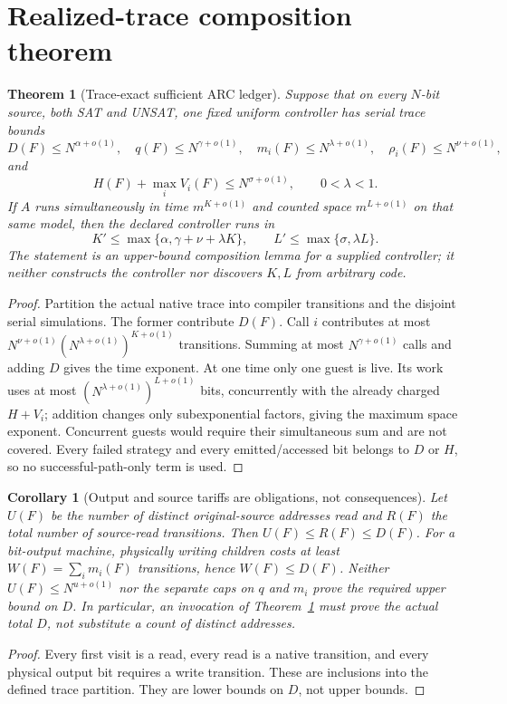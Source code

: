 \documentclass[11pt]{article}
\newtheorem{theorem}{Theorem}
\newtheorem{corollary}{Corollary}
\begin{document}
\section{Realized-trace composition theorem}
\begin{theorem}[Trace-exact sufficient ARC ledger]\label{thm:ledger}
Suppose that on every $N$-bit source, both SAT and UNSAT, one fixed uniform
controller has serial trace bounds
\[
 D(F)\le N^{\alpha+o(1)},\quad q(F)\le N^{\gamma+o(1)},\quad
 m_i(F)\le N^{\lambda+o(1)},\quad \rho_i(F)\le N^{\nu+o(1)},
\]
and
\[
 H(F)+\max_i V_i(F)\le N^{\sigma+o(1)},\qquad 0<\lambda<1.
\]
If $A$ runs simultaneously in time $m^{K+o(1)}$ and counted space
$m^{L+o(1)}$ on that same model, then the declared controller runs in
\[
 K'\le\max\{\alpha,\gamma+\nu+\lambda K\},\qquad
 L'\le\max\{\sigma,\lambda L\}.
\]
The statement is an upper-bound composition lemma for a supplied controller;
it neither constructs the controller nor discovers $K,L$ from arbitrary code.
\end{theorem}
\begin{proof}
Partition the actual native trace into compiler transitions and the disjoint
serial simulations.  The former contribute $D(F)$.  Call $i$ contributes at
most
$N^{\nu+o(1)}(N^{\lambda+o(1)})^{K+o(1)}$ transitions.  Summing at most
$N^{\gamma+o(1)}$ calls and adding $D$ gives the time exponent.  At one time
only one guest is live.  Its work uses at most
$(N^{\lambda+o(1)})^{L+o(1)}$ bits, concurrently with the already charged
$H+V_i$; addition changes only subexponential factors, giving the maximum
space exponent.  Concurrent guests would require their simultaneous sum and
are not covered.  Every failed strategy and every emitted/accessed bit belongs
to $D$ or $H$, so no successful-path-only term is used.
\end{proof}

\begin{corollary}[Output and source tariffs are obligations, not consequences]
Let $U(F)$ be the number of distinct original-source addresses read and $R(F)$
the total number of source-read transitions.  Then $U(F)\le R(F)\le D(F)$.
For a bit-output machine, physically writing children costs at least
$W(F)=\sum_i m_i(F)$ transitions, hence $W(F)\le D(F)$.  Neither
$U(F)\le N^{u+o(1)}$ nor the separate caps on $q$ and $m_i$ prove the required
upper bound on $D$.  In particular, an invocation of Theorem~\ref{thm:ledger}
must prove the actual total $D$, not substitute a count of distinct addresses.
\end{corollary}
\begin{proof}
Every first visit is a read, every read is a native transition, and every
physical output bit requires a write transition.  These are inclusions into the
defined trace partition.  They are lower bounds on $D$, not upper bounds.
\end{proof}
\end{document}
